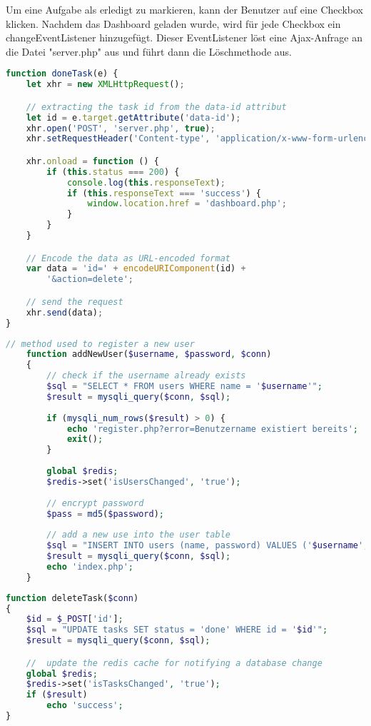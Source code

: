 Um eine Aufgabe als erledigt zu markieren, kann der Benutzer auf eine Checkbox klicken. Nachdem das Dashboard geladen wurde, wird für jede Checkbox ein changeEventListener hinzugefügt. Dieser EventListener löst eine Ajax-Anfrage an die Datei "server.php" aus und führt dann die Löschmethode aus.

\begin{lstlisting}[language=Javascript, caption=Ajax Request für die Markierung einer Aufgabe als fertig]
function doneTask(e) {
    let xhr = new XMLHttpRequest();

    // extracting the task id from the data-id attribut
    let id = e.target.getAttribute('data-id');
    xhr.open('POST', 'server.php', true);
    xhr.setRequestHeader('Content-type', 'application/x-www-form-urlencoded');

    xhr.onload = function () {
        if (this.status === 200) {
            console.log(this.responseText);
            if (this.responseText === 'success') {
                window.location.href = 'dashboard.php';
            }
        }
    }

    // Encode the data as URL-encoded format
    var data = 'id=' + encodeURIComponent(id) +
        '&action=delete';

    // send the request
    xhr.send(data);
}
    \end{lstlisting}


\begin{lstlisting}[language=PHP, caption=Methode für die Estellung eines neues Benutzers]
        // method used to register a new user
    function addNewUser($username, $password, $conn)
    {
        // check if the username already exists
        $sql = "SELECT * FROM users WHERE name = '$username'";
        $result = mysqli_query($conn, $sql);
    
        if (mysqli_num_rows($result) > 0) {
            echo 'register.php?error=Benutzername existiert bereits';
            exit();
        }
    
        global $redis;
        $redis->set('isUsersChanged', 'true');
    
        // encrypt password
        $pass = md5($password);
    
        // add a new use into the user table
        $sql = "INSERT INTO users (name, password) VALUES ('$username', '$pass')";
        $result = mysqli_query($conn, $sql);
        echo 'index.php';
    }
\end{lstlisting}


\begin{lstlisting}[language=PHP, caption=Methode die Erledigung einer Aufgabe]
function deleteTask($conn)
{
    $id = $_POST['id'];
    $sql = "UPDATE tasks SET status = 'done' WHERE id = '$id'";
    $result = mysqli_query($conn, $sql);

    //  update the redis cache for notifying a database change
    global $redis;
    $redis->set('isTasksChanged', 'true');
    if ($result)
        echo 'success';
}
\end{lstlisting}

